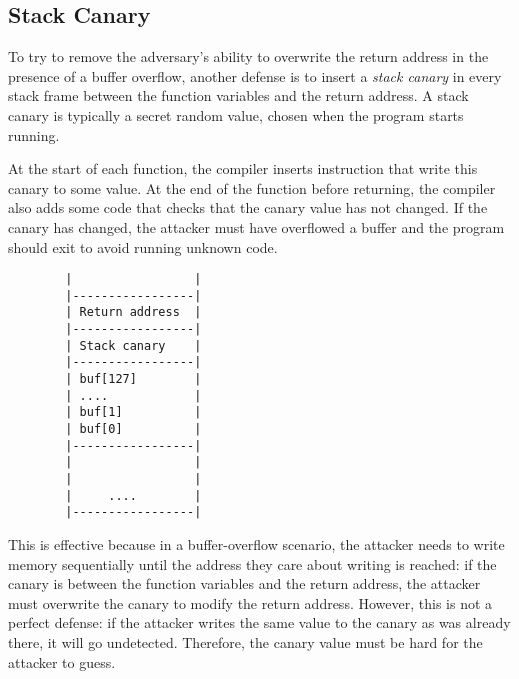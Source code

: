\subsection{Stack Canary}
To try to remove the adversary's ability to overwrite the return address in the presence of a buffer overflow, another defense is to insert a \emph{stack canary} in every stack frame between the function variables and the return address.
A stack canary is typically a secret random value, chosen when the program starts running. 

At the start of each function,
the compiler inserts instruction that write this canary to some value. 
At the end of the function before returning, the compiler also 
adds some code that checks that the canary value has not changed.
If the canary has changed, the attacker must have overflowed a buffer and the
program should exit to avoid running unknown code. 

\begin{verbatim}
        |                 |
        |-----------------|
        | Return address  |
        |-----------------|
        | Stack canary    |
        |-----------------|
        | buf[127]        |
        | ....            |
        | buf[1]          |
        | buf[0]          |
        |-----------------|
        |                 |
        |                 |
        |     ....        |
        |-----------------|
\end{verbatim}
This is effective because in a buffer-overflow scenario, the attacker needs to write memory sequentially until the address they care about writing is reached: if the canary is between the function variables and the return address, the attacker must overwrite the canary to modify the return address. However, this is not a perfect defense: if the attacker writes the same value to the canary as was already there, it will go undetected. Therefore, the canary value must be hard for the attacker to guess.

